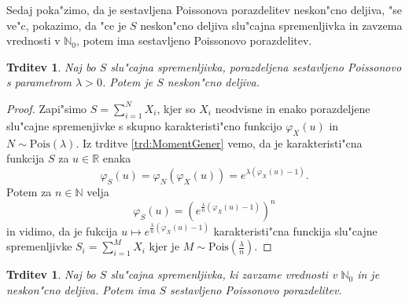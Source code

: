 \documentclass[12pt, a4paper, reqno]{amsart}
\theoremstyle{definition}
\theoremstyle{plain}
\newtheorem{trditev}[definicija]{Trditev}
\newcommand{\R}{\mathbb{R}}
\newcommand{\N}{\mathbb{N}}
\newcommand{\1}{\mathds{1}}
\newcommand{\Pois}[1]{\text{Pois}(#1)}
\begin{document}
    Sedaj poka"zimo, da je sestavljena Poissonova porazdelitev neskon"cno deljiva, "se ve"c, pokazimo, 
    da "ce je $S$ neskon"cno deljiva slu"cajna spremenljivka in zavzema vrednosti v $\N_0$, 
    potem ima sestavljeno Poissonovo porazdelitev.

    \begin{trditev}
        Naj bo $S$ slu"cajna spremenljivka, porazdeljena sestavljeno Poissonovo s parametrom $\lambda > 0$.
        Potem je $S$ neskon"cno deljiva.
        \label{trd:CPDneskoncnoDeljiva}
    \end{trditev}

    \begin{proof}
        Zapi"simo $S = \sum_{i=1}^NX_i$, kjer so $X_i$ neodvisne in enako porazdeljene slu"cajne 
        spremenjivke s skupno karakteristi"cno funkcijo $\varphi_X(u)$ in $N\sim\Pois{\lambda}$. Iz 
        trditve \ref{trd:MomentGener} vemo, da je karakteristi"cna funkcija $S$ za $u\in \R$ enaka
        \begin{equation*}
            \varphi_S(u) = \varphi_N\left(\varphi_X(u)\right) = e^{\lambda\left(\varphi_X(u) - 1\right)}.
        \end{equation*}
        Potem za $n\in\N$ velja
        \begin{equation*}
            \varphi_{S}(u) = \left(e^{\frac{\lambda}{n}\left(\varphi_X(u) - 1\right)}\right)^n
        \end{equation*}
        in vidimo, da je fukcija $u\mapsto e^{\frac{\lambda}{n}\left(\varphi_X(u) - 1\right)}$ karakteristi"cna
        funckija slu"cajne spremenljivke $S_i = \sum_{i = 1}^MX_i$ kjer je $M\sim\Pois{\tfrac{\lambda}{n}}$.
    \end{proof}

    \begin{trditev}
        Naj bo $S$ slu"cajna spremenljivka, ki zavzame vrednosti v $\N_0$ in je neskon"cno deljiva.
        Potem ima $S$ sestavljeno Poissonovo porazdelitev.
        \label{trd:neskoncnoDeljivaYslediCPD}
    \end{trditev}
\end{document}
